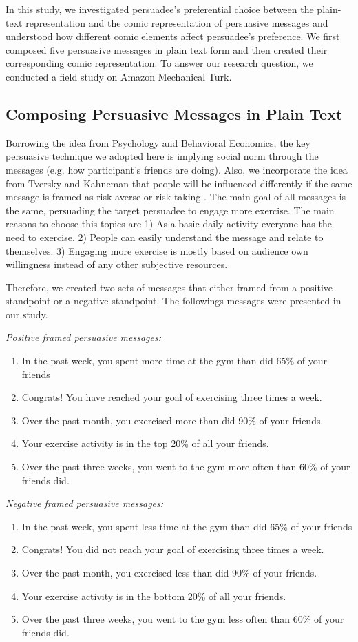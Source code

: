 In this study, we investigated persuadee's preferential choice between the plain-text representation and the comic representation of persuasive messages and understood how different comic elements affect persuadee's preference. We first composed five persuasive messages in plain text form and then created their corresponding comic representation. To answer our research question, we conducted a field study on Amazon Mechanical Turk. \par
\subsection{Composing Persuasive Messages in Plain Text}
Borrowing the idea from Psychology and Behavioral Economics, the key persuasive technique we adopted here is implying social norm through the messages (e.g. how participant's friends are doing). Also, we incorporate the idea from Tversky and Kahneman that people will be influenced differently if the same message is framed as risk averse or risk taking \cite{tversky1981framing}. The main goal of all messages is the same, persuading the target persuadee to engage more exercise. The main reasons to choose this topics are 1) As a basic daily activity everyone has the need to exercise. 2) People can easily understand the message and relate to themselves. 3) Engaging more exercise is mostly based on audience own willingness instead of any other subjective resources.\par
Therefore, we created two sets of messages that either framed from a positive standpoint or a negative standpoint. The followings messages were presented in our study.\par
\textit{Positive framed persuasive messages:}
\begin{enumerate}
 \item In the past week, you spent more time at the gym than did 65\% of your friends
 \item Congrats! You have reached your goal of exercising three times a week.
 \item Over the past month, you exercised more than did 90\% of your friends.
 \item Your exercise activity is in the top 20\% of all your friends.
 \item Over the past three weeks, you went to the gym more often than 60\% of your friends did.
\end{enumerate}\par
\textit{Negative framed persuasive messages:}
\begin{enumerate}
 \item	In the past week, you spent less time at the gym than did 65\% of your friends
 \item Congrats! You did not reach your goal of exercising three times a week.
 \item	Over the past month, you exercised less than did 90\% of your friends.
 \item	Your exercise activity is in the bottom 20\% of all your friends.
 \item	Over the past three weeks, you went to the gym less often than 60\% of your friends did.
\end{enumerate}

